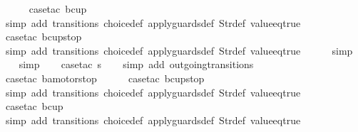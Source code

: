 \begin{isabellebody}
\ \ \ \ \isamarkupfalse%
\ {\isacharparenleft}case{\isacharunderscore}tac\ {\isachardoublequoteopen}bc{\isacharequal}up{}{}{\isachardoublequoteclose}{\isacharparenright}\isanewline
\ \ \ \ \ \isamarkupfalse%
\ {\isacharparenleft}simp\ add{\isacharcolon}\ transitions\ choice{\isacharunderscore}def\ apply{\isacharunderscore}guards{\isacharunderscore}def\ Str{\isacharunderscore}def\ value{\isacharunderscore}eq{\isacharunderscore}true{\isacharparenright}\isanewline
\ \ \ \ \isamarkupfalse%
\ {\isacharparenleft}case{\isacharunderscore}tac\ {\isachardoublequoteopen}bc{\isacharequal}up{}{}stop{\isachardoublequoteclose}{\isacharparenright}\isanewline
\ \ \ \ \ \isamarkupfalse%
\ {\isacharparenleft}simp\ add{\isacharcolon}\ transitions\ choice{\isacharunderscore}def\ apply{\isacharunderscore}guards{\isacharunderscore}def\ Str{\isacharunderscore}def\ value{\isacharunderscore}eq{\isacharunderscore}true{\isacharparenright}\isanewline
\ \ \ \ \isamarkupfalse%
\ simp\isanewline
\ \ \isamarkupfalse%
\ simp\isanewline
\ \ \isamarkupfalse%
\ {\isacharparenleft}case{\isacharunderscore}tac\ {\isachardoublequoteopen}s{\isacharequal}{}{\isachardoublequoteclose}{\isacharparenright}\isanewline
\ \ \isamarkupfalse%
\ {\isacharparenleft}simp\ add{\isacharcolon}\ outgoing{\isacharunderscore}transitions{\isacharunderscore}{}{\isacharparenright}\isanewline
\ \ \ \isamarkupfalse%
\ {\isacharparenleft}case{\isacharunderscore}tac\ {\isachardoublequoteopen}ba{\isacharequal}motorstop{}{\isachardoublequoteclose}{\isacharparenright}\isanewline
\ \ \ \ \isamarkupfalse%
\ {\isacharparenleft}case{\isacharunderscore}tac\ {\isachardoublequoteopen}bc{\isacharequal}up{}{}stop{\isachardoublequoteclose}{\isacharparenright}\isanewline
\ \ \ \ \ \isamarkupfalse%
\ {\isacharparenleft}simp\ add{\isacharcolon}\ transitions\ choice{\isacharunderscore}def\ apply{\isacharunderscore}guards{\isacharunderscore}def\ Str{\isacharunderscore}def\ value{\isacharunderscore}eq{\isacharunderscore}true{\isacharparenright}\isanewline
\ \ \ \ \isamarkupfalse%
\ {\isacharparenleft}case{\isacharunderscore}tac\ {\isachardoublequoteopen}bc{\isacharequal}up{}{}{\isachardoublequoteclose}{\isacharparenright}\isanewline
\ \ \ \ \ \isamarkupfalse%
\ {\isacharparenleft}simp\ add{\isacharcolon}\ transitions\ choice{\isacharunderscore}def\ apply{\isacharunderscore}guards{\isacharunderscore}def\ Str{\isacharunderscore}def\ value{\isacharunderscore}eq{\isacharunderscore}true{\isacharparenright}\isanewline

\end{isabellebody}
